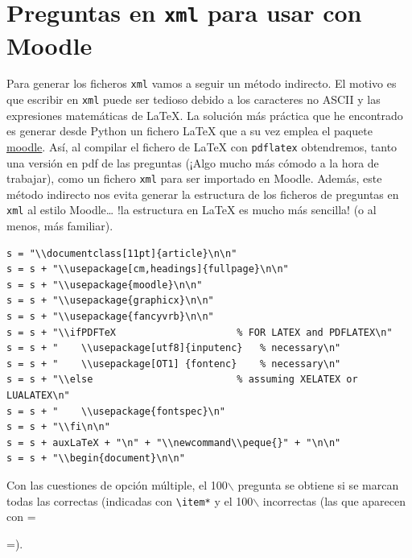 \documentclass[10pt,a4paper]{report}
\begin{document}
\chapter{Preguntas en \texttt{xml} para usar con Moodle}
\label{sec:org793b3f6}

Para generar los ficheros \texttt{xml} vamos a seguir un método
indirecto. El motivo es que escribir en \texttt{xml} puede ser tedioso
debido a los caracteres no ASCII y las expresiones matemáticas de
\LaTeX{}. La solución más práctica que he encontrado es generar desde
Python un fichero \LaTeX{} que a su vez emplea el paquete
\href{https://gitlab.mattgk.myds.me/mattguer/moodle/}{moodle}. Así, al
compilar el fichero de \LaTeX{} con \texttt{pdflatex} obtendremos, tanto
una versión en pdf de las preguntas (¡Algo mucho más cómodo a la hora
de trabajar), como un fichero \texttt{xml} para ser importado en
Moodle. Además, este método indirecto nos evita generar la estructura
de los ficheros de preguntas en \texttt{xml} al estilo Moodle\dots{} !la
estructura en \LaTeX{} es mucho más sencilla! (o al menos, más
familiar).

\begin{verbatim}
s = "\\documentclass[11pt]{article}\n\n"
s = s + "\\usepackage[cm,headings]{fullpage}\n\n"
s = s + "\\usepackage{moodle}\n\n"
s = s + "\\usepackage{graphicx}\n\n"
s = s + "\\usepackage{fancyvrb}\n\n"
s = s + "\\ifPDFTeX                     % FOR LATEX and PDFLATEX\n"
s = s + "    \\usepackage[utf8]{inputenc}   % necessary\n"
s = s + "    \\usepackage[OT1] {fontenc}    % necessary\n"
s = s + "\\else                         % assuming XELATEX or LUALATEX\n"
s = s + "    \\usepackage{fontspec}\n"
s = s + "\\fi\n\n"
s = s + auxLaTeX + "\n" + "\\newcommand\\peque{}" + "\n\n"
s = s + "\\begin{document}\n\n"
\end{verbatim}

Con las cuestiones de opción múltiple, el 100$\backslash$%
pregunta se obtiene si se marcan todas las correctas (indicadas con
\texttt{\textbackslash{}item*} y el 100$\backslash$%
incorrectas (las que aparecen con =\item =).
\end{document}
